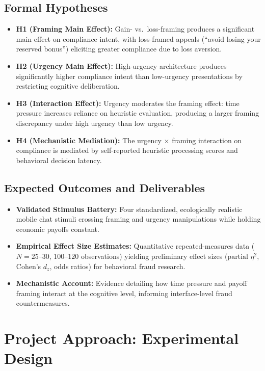 \documentclass[11pt]{article}
\begin{document}
\subsection{Formal Hypotheses}
\begin{itemize}[leftmargin=*]
    \item \textbf{H1 (Framing Main Effect):} Gain- vs.\ loss-framing produces a significant main effect on compliance intent, with loss-framed appeals (``avoid losing your reserved bonus'') eliciting greater compliance due to loss aversion.
    \item \textbf{H2 (Urgency Main Effect):} High-urgency architecture produces significantly higher compliance intent than low-urgency presentations by restricting cognitive deliberation.
    \item \textbf{H3 (Interaction Effect):} Urgency moderates the framing effect: time pressure increases reliance on heuristic evaluation, producing a larger framing discrepancy under high urgency than low urgency.
    \item \textbf{H4 (Mechanistic Mediation):} The urgency $\times$ framing interaction on compliance is mediated by self-reported heuristic processing scores and behavioral decision latency.
\end{itemize}

\subsection{Expected Outcomes and Deliverables}
\begin{itemize}[leftmargin=*]
    \item \textbf{Validated Stimulus Battery:} Four standardized, ecologically realistic mobile chat stimuli crossing framing and urgency manipulations while holding economic payoffs constant.
    \item \textbf{Empirical Effect Size Estimates:} Quantitative repeated-measures data ($N=25$--$30$, $100$--$120$ observations) yielding preliminary effect sizes ($\text{partial } \eta^2$, Cohen's $d_z$, odds ratios) for behavioral fraud research.
    \item \textbf{Mechanistic Account:} Evidence detailing how time pressure and payoff framing interact at the cognitive level, informing interface-level fraud countermeasures.
\end{itemize}

\section{Project Approach: Experimental Design}
\end{document}
